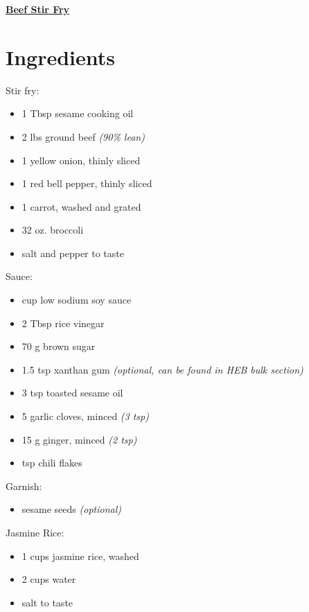 \documentclass[11pt]{article}
\begin{document}
	\begin{center}\begin{huge}\underline{\textbf{Beef Stir Fry}}\end{huge}\end{center}

	\section*{Ingredients}
	Stir fry:\vspace*{-1.5ex}
	\begin{itemize}
		\item 1 Tbsp sesame cooking oil
		\item 2 lbs ground beef \textit{(90\% lean)}
		\item 1 yellow onion, thinly sliced
		\item 1 red bell pepper, thinly sliced
		\item 1 carrot, washed and grated
		\item 32 oz. broccoli
		\item salt and pepper to taste
	\end{itemize}
	
	Sauce:\vspace*{-1.5ex}
	\begin{itemize}
		\item {} cup low sodium soy sauce
		\item 2 Tbsp rice vinegar
		\item 70 g brown sugar
		\item 1.5 tsp xanthan gum \textit{(optional, can be found in HEB bulk section)}
		\item 3 tsp toasted sesame oil
		\item 5 garlic cloves, minced \textit{(3 tsp)}
		\item 15 g ginger, minced \textit{(2 tsp)}
		\item {} tsp chili flakes
	\end{itemize}
		
	Garnish:\vspace*{-1.5ex}
	\begin{itemize}
		\item sesame seeds \textit{(optional)}
	\end{itemize}
		
	Jasmine Rice:\vspace*{-1.5ex}
	\begin{itemize}
		\item 1 cups jasmine rice, washed
		\item 2 cups water
		\item salt to taste
	\end{itemize}
	
\end{document}
